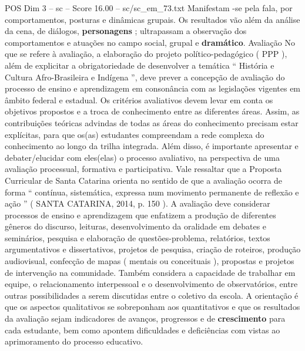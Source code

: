 \begin{textsample}{POS Dim 3 – sc – Score 16.00 – sc/sc\_em\_73.txt}
Manifestam -se pela fala, por comportamentos, posturas e dinâmicas grupais.
Os resultados vão além da análise da cena, de diálogos, \textbf{personagens} ; ultrapassam a observação dos comportamentos e atuações no campo social, grupal e \textbf{dramático}.
Avaliação No que se refere à avaliação, a elaboração do projeto político-pedagógico ( PPP ), além de explicitar a obrigatoriedade de desenvolver a temática “ História e Cultura Afro-Brasileira e Indígena ”, deve prever a concepção de avaliação do processo de ensino e aprendizagem em consonância com as legislações vigentes em âmbito federal e estadual.
Os critérios avaliativos devem levar em conta os objetivos propostos e a troca de conhecimento entre as diferentes áreas.
Assim, as contribuições teóricas advindas de todas as áreas do conhecimento precisam estar explícitas, para que os(as) estudantes compreendam a rede complexa do conhecimento ao longo da trilha integrada.
Além disso, é importante apresentar e debater/elucidar com eles(elas) o processo avaliativo, na perspectiva de uma avaliação processual, formativa e participativa.
Vale ressaltar que a Proposta Curricular de Santa Catarina orienta no sentido de que a avaliação ocorra de forma “ contínua, sistemática, expressa num movimento permanente de reflexão e ação ” ( SANTA CATARINA, 2014, p. 150 ).
A avaliação deve considerar processos de ensino e aprendizagem que enfatizem a produção de diferentes gêneros do discurso, leituras, desenvolvimento da oralidade em debates e seminários, pesquisa e elaboração de questões-problema, relatórios, textos argumentativos e dissertativos, projetos de pesquisa, criação de roteiros, produção audiovisual, confecção de mapas ( mentais ou conceituais ), propostas e projetos de intervenção na comunidade.
Também considera a capacidade de trabalhar em equipe, o relacionamento interpessoal e o desenvolvimento de observatórios, entre outras possibilidades a serem discutidas entre o coletivo da escola.
A orientação é que os aspectos qualitativos se sobreponham aos quantitativos e que os resultados da avaliação sejam indicadores de avanços, progressos e de \textbf{crescimento} para cada estudante, bem como apontem dificuldades e deficiências com vistas ao aprimoramento do processo educativo.

\end{textsample}
